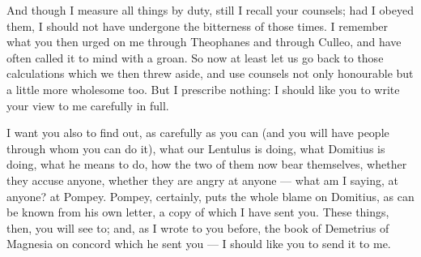  And though I measure all things by duty, still I recall your counsels; had I obeyed them, I should not have undergone the bitterness of those times. I remember what you then urged on me through Theophanes and through Culleo, and have often called it to mind with a groan. So now at least let us go back to those calculations which we then threw aside, and use counsels not only honourable but a little more wholesome too. But I prescribe nothing: I should like you to write your view to me carefully in full.

 I want you also to find out, as carefully as you can (and you will have people through whom you can do it), what our Lentulus is doing, what Domitius is doing, what he means to do, how the two of them now bear themselves, whether they accuse anyone, whether they are angry at anyone --- what am I saying, at anyone? at Pompey. Pompey, certainly, puts the whole blame on Domitius, as can be known from his own letter, a copy of which I have sent you. These things, then, you will see to; and, as I wrote to you before, the book of Demetrius of Magnesia on concord which he sent you --- I should like you to send it to me.
